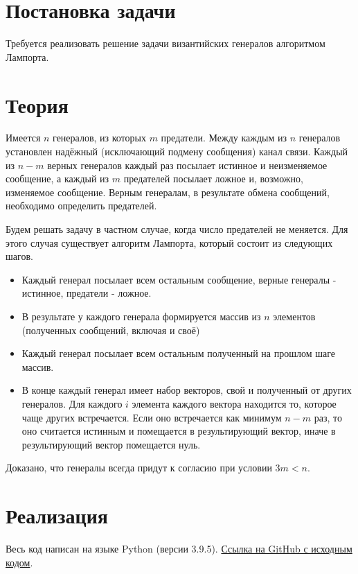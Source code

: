 \documentclass[a4paper,12pt]{article}
\begin{document}
    
    \newpage

    \tableofcontents
    \listoffigures
    \listoftables
    \newpage

    \section{Постановка задачи}
    \quad Требуется реализовать решение задачи византийских генералов алгоритмом Лампорта.

    \section{Теория}
    \quad Имеется $ n $ генералов, из которых $ m $ предатели.
    Между каждым из $ n $ генералов установлен надёжный (исключающий подмену сообщения) канал связи.
    Каждый из $ n - m $ верных генералов каждый раз посылает истинное и неизменяемое сообщение,
    а каждый из $ m $ предателей посылает ложное и, возможно, изменяемое сообщение.
    Верным генералам, в результате обмена сообщений, необходимо определить предателей.

    Будем решать задачу в частном случае, когда число предателей не меняется.
    Для этого случая существует алгоритм Лампорта, который состоит из следующих шагов.

    \begin{itemize}
        \item Каждый генерал посылает всем остальным сообщение, верные генералы - истинное, предатели - ложное.
        \item В результате у каждого генерала формируется массив из $ n $ элементов (полученных сообщений, включая и своё)
        \item Каждый генерал посылает всем остальным полученный на прошлом шаге массив.
        \item В конце каждый генерал имеет набор векторов, свой и полученный от других генералов.
        Для каждого $ i $ элемента каждого вектора находится то, которое чаще других встречается.
        Если оно встречается как минимум $ n - m $ раз, то оно считается истинным и помещается в результирующий вектор,
        иначе в результирующий вектор помещается нуль. 
    \end{itemize}

    Доказано, что генералы всегда придут к согласию при условии $ 3m < n $.

    \section{Реализация}
    \quad Весь код написан на языке Python (версии 3.9.5).
    \href{https://github.com/BoIlAl/Networks/tree/master/lab3}{Ссылка на GitHub с исходным кодом}.
\end{document}
